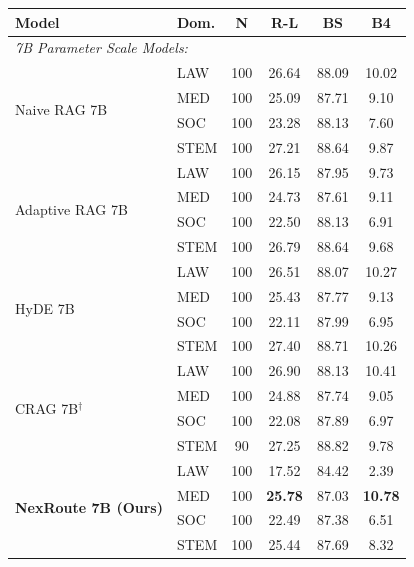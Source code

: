 \documentclass[a4paper,fleql]{cas-sc}
\begin{document}
\vspace{4pt}
\begin{center}
\begingroup
{}
\label{tab:domain_breakdown}
\vspace{4pt}
{\small
\begin{tabular}{llcccc}
\toprule
\textbf{Model} & \textbf{Dom.} & \textbf{N} & \textbf{R-L} & \textbf{BS} & \textbf{B4} \\
\midrule
\multicolumn{6}{l}{\textit{7B Parameter Scale Models:}} \\
\multirow{4}{*}{Naive RAG 7B}
  & LAW  & 100 & 26.64 & 88.09 & 10.02 \\
  & MED  & 100 & 25.09 & 87.71 &  9.10 \\
  & SOC  & 100 & 23.28 & 88.13 &  7.60 \\
  & STEM & 100 & 27.21 & 88.64 &  9.87 \\
\midrule
\multirow{4}{*}{Adaptive RAG 7B}
  & LAW  & 100 & 26.15 & 87.95 &  9.73 \\
  & MED  & 100 & 24.73 & 87.61 &  9.11 \\
  & SOC  & 100 & 22.50 & 88.13 &  6.91 \\
  & STEM & 100 & 26.79 & 88.64 &  9.68 \\
\midrule
\multirow{4}{*}{HyDE 7B}
  & LAW  & 100 & 26.51 & 88.07 & 10.27 \\
  & MED  & 100 & 25.43 & 87.77 &  9.13 \\
  & SOC  & 100 & 22.11 & 87.99 &  6.95 \\
  & STEM & 100 & 27.40 & 88.71 & 10.26 \\
\midrule
\multirow{4}{*}{CRAG 7B$^\dagger$}
  & LAW  & 100 & 26.90 & 88.13 & 10.41 \\
  & MED  & 100 & 24.88 & 87.74 &  9.05 \\
  & SOC  & 100 & 22.08 & 87.89 &  6.97 \\
  & STEM &  90 & 27.25 & 88.82 &  9.78 \\
\midrule
\multirow{4}{*}{\textbf{NexRoute 7B (Ours)}}
  & LAW  & 100 & 17.52 & 84.42 &  2.39 \\
  & MED  & 100 & \textbf{25.78} & 87.03 & \textbf{10.78} \\
  & SOC  & 100 & 22.49 & 87.38 &  6.51 \\
  & STEM & 100 & 25.44 & 87.69 &  8.32 \\
\bottomrule
\end{tabular}
}
\endgroup
\end{center}
\end{document}
